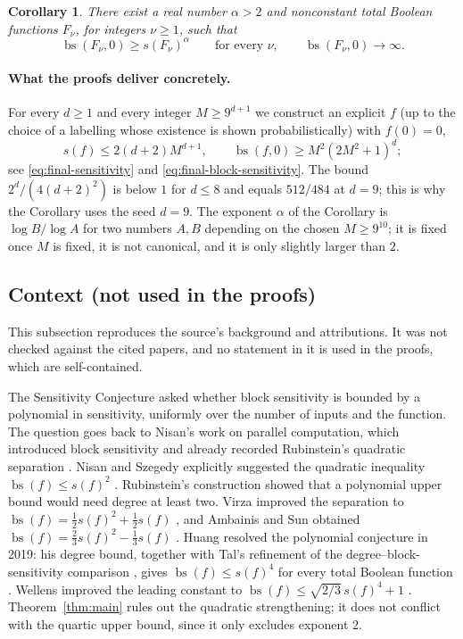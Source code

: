 \documentclass[11pt]{article}
\newcommand{\bs}{\operatorname{bs}}
\newtheorem{corollary}[theorem]{Corollary}
\theoremstyle{definition}
\theoremstyle{remark}
\begin{document}
\begin{corollary}\label{cor:power-separation}
There exist a real number \(\alpha>2\) and nonconstant total Boolean
functions \(F_\nu\), for integers \(\nu\geq1\), such that
\[
 \bs(F_\nu,0)\geq s(F_\nu)^\alpha
 \qquad\text{for every }\nu,
 \qquad
 \bs(F_\nu,0)\longrightarrow\infty .
\]
\end{corollary}

\paragraph{What the proofs deliver concretely.}
For every \(d\ge1\) and every integer \(M\ge9^{d+1}\) we construct an explicit
\(f\) (up to the choice of a labelling whose existence is shown
probabilistically) with \(f(0)=0\),
\[
 s(f)\le 2(d+2)M^{d+1},\qquad \bs(f,0)\ge M^2(2M^2+1)^d ;
\]
see \eqref{eq:final-sensitivity} and \eqref{eq:final-block-sensitivity}.
The bound \(2^d/(4(d+2)^2)\) is below \(1\) for \(d\le 8\) and equals
\(512/484\) at \(d=9\); this is why the Corollary uses the seed \(d=9\).
The exponent \(\alpha\) of the Corollary is \(\log B/\log A\) for two numbers
\(A,B\) depending on the chosen \(M\ge 9^{10}\); it is fixed once \(M\) is
fixed, it is not canonical, and it is only slightly larger than \(2\).

\subsection{Context (not used in the proofs)}

This subsection reproduces the source's background and attributions. It was
not checked against the cited papers, and no statement in it is used in the
proofs, which are self-contained.

The Sensitivity Conjecture asked whether block sensitivity is bounded by a
polynomial in sensitivity, uniformly over the number of inputs and the
function. The question goes back to Nisan's work on parallel computation,
which introduced block sensitivity and already recorded Rubinstein's
quadratic separation \cite[Section~2]{Nisan1989}.
Nisan and Szegedy explicitly suggested the quadratic inequality
\(\bs(f)\le s(f)^2\) \cite[Section~4]{NisanSzegedy1994}.
Rubinstein's construction \cite{Rubinstein1995} showed that a polynomial
upper bound would need degree at least two. Virza improved the separation
to \(\bs(f)=\tfrac12s(f)^2+\tfrac12s(f)\) \cite{Virza2011}, and
Ambainis and Sun obtained
\(\bs(f)=\frac23s(f)^2-\frac13s(f)\) \cite[Theorem~1]{AmbainisSun2011}.
Huang resolved the polynomial conjecture in 2019: his degree bound,
together with Tal's refinement of the degree--block-sensitivity comparison
\cite{Tal2013}, gives \(\bs(f)\le s(f)^4\) for every total Boolean function
\cite[Theorem~1.5]{Huang2019}. Wellens improved the leading constant to
\(\bs(f)\le\sqrt{2/3}\,s(f)^4+1\) \cite[Corollary~4.2]{Wellens2022}.
Theorem~\ref{thm:main} rules out the quadratic strengthening; it does not
conflict with the quartic upper bound, since it only excludes exponent
\(2\).
\end{document}
